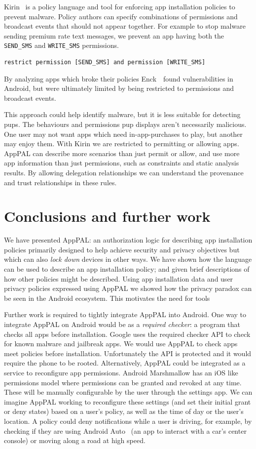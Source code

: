 \documentclass[]{llncs}
\begin{document}
Kirin~\cite{Enck:2009ko} is a policy language and tool for enforcing app installation policies to prevent malware.
Policy authors can specify combinations of permissions and broadcast events that should not appear together.
For example to stop malware sending premium rate text messages, we prevent
 an app having both the \texttt{SEND\_SMS} and \texttt{WRITE\_SMS} permissions.
\begin{lstlisting}
restrict permission [SEND_SMS] and permission [WRITE_SMS]
\end{lstlisting}
By analyzing apps which broke their policies Enck~\etal~found vulnerabilities in Android, but were ultimately limited by being restricted to permissions and broadcast events.

This approach could help identify malware, but it is less suitable for detecting \acp{pup}.
The behaviours and permissions \ac{pup} displays aren't necessarily malicious.
One user may not want apps which need in-app-purchases to play, but another may enjoy them.
With Kirin we are restricted to permitting or allowing apps.
AppPAL can describe more scenarios than just permit or allow, and use more app information than just permissions, such as constraints and static analysis results.
By allowing delegation relationships we can understand the provenance and trust relationships in these rules.

\section{Conclusions and further work}

We have presented AppPAL: an authorization logic for describing app installation policies primarily designed to help achieve security and privacy objectives but which can also \emph{lock down} devices in other ways.
We have shown how the language can be used to describe an app installation policy;
  and given brief descriptions of how other policies might be described.
Using app installation data and user privacy policies expressed using AppPAL we showed how the privacy paradox can be seen in the Android ecosystem.
This motivates the need for tools

Further work is required to tightly integrate AppPAL into Android.
One way to integrate AppPAL on Android would be as a \emph{required checker}: a program that checks all apps before installation.
Google uses the required checker API to check for known malware and jailbreak apps.
We would use AppPAL to check apps meet policies before installation.
Unfortunately the API is protected and it would require the phone to be rooted.
Alternatively, AppPAL could be integrated as a service to reconfigure app permissions.
Android Marshmallow has an iOS like permissions model where permissions can be granted and revoked at any time.
These will be manually configurable by the user through the settings app.
We can imagine AppPAL working to reconfigure these settings (and set their initial grant or deny states) based on a user's policy, as well as the time of day or the user's location.
A policy could deny notifications while a user is driving, for example, by checking if they are using Android Auto~\cite{AndroidAuto:uw} (an app to interact with a car's center console) or moving along a road at high speed.
\end{document}
